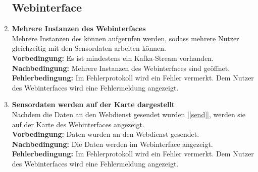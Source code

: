 \begin{enumerate}[label=\textbf{PF\arabic{enumi}0}]
	
	 	
	 
 
	 \subsection{Webinterface}
	 \setcounter{enumi}{199}
	 
	 \item \textbf{Mehrere Instanzen des Webinterfaces}\\
		 Mehrere Instanzen des  können aufgerufen werden, sodass mehrere Nutzer gleichzeitig mit den Sensordaten arbeiten können.\\
		 \textbf{Vorbedingung:} Es ist mindestens ein Kafka-Stream vorhanden.\\
		 \textbf{Nachbedingung:} Mehrere Instanzen des Webinterfaces sind geöffnet.\\
	 	\textbf{Fehlerbedingung:} Im Fehlerprotokoll wird ein Fehler vermerkt. Dem Nutzer des Webinterfaces wird eine Fehlermeldung angezeigt.

	 \item \textbf{Sensordaten werden auf der Karte dargestellt}\\
	 	Nachdem die Daten an den Webdienst gesendet wurden [\ref{send}], werden sie auf der Karte des Webinterfaces angezeigt.\\
	 	\textbf{Vorbedingung:} Daten wurden an den Webdienst gesendet.\\
	 	\textbf{Nachbedingung:} Die Daten werden im Webinterface angezeigt.\\
	 	\textbf{Fehlerbedingung:} Im Fehlerprotokoll wird ein Fehler vermerkt. Dem Nutzer des Webinterfaces wird eine Fehlermeldung angezeigt.
	 	

\end{enumerate}
